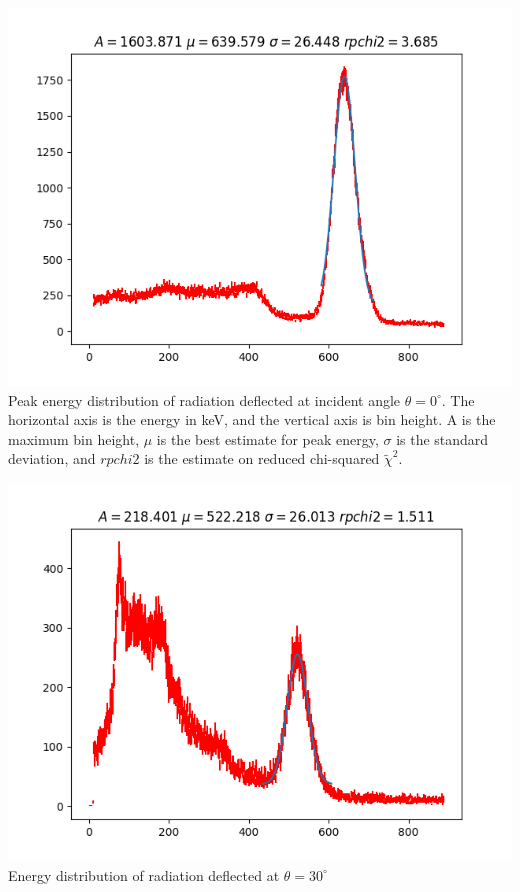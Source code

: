 \documentclass{article}
\begin{document}
\begin{center}
\includegraphics[scale=0.65]{Data/Wavelength_Data/compton_fit_thet_0_fit.png} \\
\caption[1]{ Peak energy distribution of radiation deflected at incident angle $\theta=0^{\circ}$. The horizontal axis is the energy in keV, and the vertical axis is bin height. A is the maximum bin height, $\mu$ is the best estimate for peak energy, $\sigma$ is the standard deviation, and $rpchi2$ is the estimate on reduced chi-squared $\widetilde\chi^{2}$.}
\includegraphics[scale=0.65]{Data/Wavelength_Data/compton_fit_thet_30_fit.png} \\
\caption[2]{ Energy distribution of radiation deflected at $\theta=30^{\circ}$}

\end{center}
\end{document}
